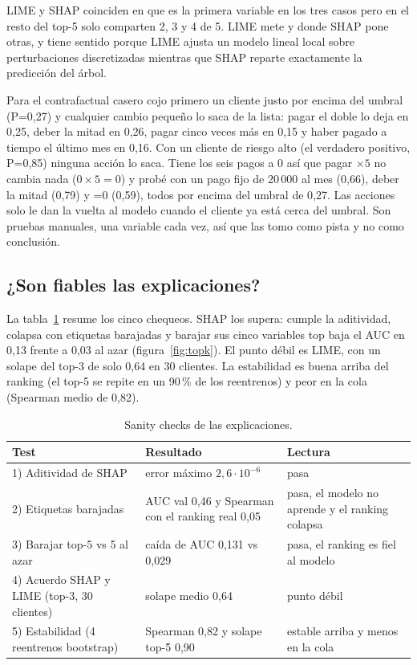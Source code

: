\documentclass[10pt,a4paper]{article}
\newcommand{\var}[1]{\texttt{\detokenize{#1}}}
\begin{document}
LIME y SHAP coinciden en que \var{PAY_0} es la primera variable en los tres casos pero en el resto del top-5 solo comparten 2, 3 y 4 de 5. LIME mete \var{LIMIT_BAL} y \var{BILL_AMT4} donde SHAP pone otras, y tiene sentido porque LIME ajusta un modelo lineal local sobre perturbaciones discretizadas mientras que SHAP reparte exactamente la predicción del árbol.

Para el contrafactual casero cojo primero un cliente justo por encima del umbral (P=0,27) y cualquier cambio pequeño lo saca de la lista: pagar el doble lo deja en 0,25, deber la mitad en 0,26, pagar cinco veces más en 0,15 y haber pagado a tiempo el último mes en 0,16. Con un cliente de riesgo alto (el verdadero positivo, P=0,85) ninguna acción lo saca. Tiene los seis pagos a 0 así que pagar $\times5$ no cambia nada ($0\times5=0$) y probé con un pago fijo de 20\,000 al mes (0,66), deber la mitad (0,79) y \var{PAY_0}=0 (0,59), todos por encima del umbral de 0,27. Las acciones solo le dan la vuelta al modelo cuando el cliente ya está cerca del umbral. Son pruebas manuales, una variable cada vez, así que las tomo como pista y no como conclusión.

\subsection{¿Son fiables las explicaciones?}
La tabla~\ref{tab:sanity} resume los cinco chequeos. SHAP los supera: cumple la aditividad, colapsa con etiquetas barajadas y barajar sus cinco variables top baja el AUC en 0,13 frente a 0,03 al azar (figura~\ref{fig:topk}). El punto débil es LIME, con un solape del top-3 de solo 0,64 en 30 clientes. La estabilidad es buena arriba del ranking (el top-5 se repite en un 90\,\% de los reentrenos) y peor en la cola (Spearman medio de 0,82).

\begin{table}[htbp]
\centering\small
\caption{Sanity checks de las explicaciones.}\label{tab:sanity}
\begin{tabular}{p{4.6cm}p{5cm}p{5.8cm}}
\toprule
Test & Resultado & Lectura \\
\midrule
1) Aditividad de SHAP & error máximo $2{,}6\cdot10^{-6}$ & pasa \\
2) Etiquetas barajadas & AUC val 0,46 y Spearman con el ranking real 0,05 & pasa, el modelo no aprende y el ranking colapsa \\
3) Barajar top-5 vs 5 al azar & caída de AUC 0,131 vs 0,029 & pasa, el ranking es fiel al modelo \\
4) Acuerdo SHAP y LIME (top-3, 30 clientes) & solape medio 0,64 & punto débil \\
5) Estabilidad (4 reentrenos bootstrap) & Spearman 0,82 y solape top-5 0,90 & estable arriba y menos en la cola \\
\bottomrule
\end{tabular}
\end{table}
\end{document}
